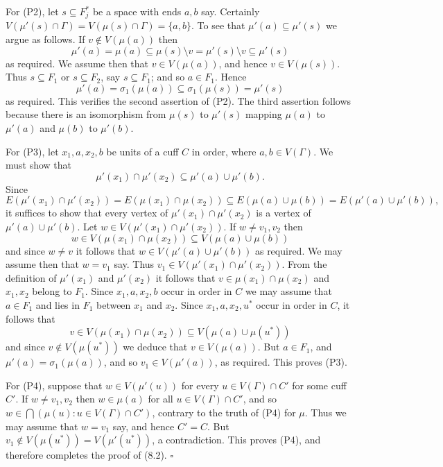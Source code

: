 For (P2), let $s \subseteq F_j^*$ be a space with ends $a, b$ say. Certainly $V(\mu'(s) \cap \Gamma) = V(\mu(s) \cap \Gamma) = \{a, b\}$. To see that $\mu'(a) \subseteq \mu'(s)$ we argue as follows. If $v \notin V(\mu(a))$ then
\begin{equation*}
\mu'(a) = \mu(a) \subseteq \mu(s) \setminus v = \mu'(s) \setminus v \subseteq \mu'(s)
\end{equation*}
as required. We assume then that $v \in V(\mu(a))$, and hence $v \in V(\mu(s))$. Thus $s \subseteq F_1$ or $s \subseteq F_2$, say $s \subseteq F_1$; and so $a \in F_1$. Hence
\begin{equation*}
\mu'(a) = \sigma_1(\mu(a)) \subseteq \sigma_1(\mu(s)) = \mu'(s)
\end{equation*}
as required. This verifies the second assertion of (P2). The third assertion follows because there is an isomorphism from $\mu(s)$ to $\mu'(s)$ mapping $\mu(a)$ to $\mu'(a)$ and $\mu(b)$ to $\mu'(b)$.

For (P3), let $x_1, a, x_2, b$ be units of a cuff $C$ in order, where $a, b \in V(\Gamma)$. We must show that
\begin{equation*}
\mu'(x_1) \cap \mu'(x_2) \subseteq \mu'(a) \cup \mu'(b).
\end{equation*}
Since
\begin{equation*}
E(\mu'(x_1) \cap \mu'(x_2)) = E(\mu(x_1) \cap \mu(x_2)) \subseteq E(\mu(a) \cup \mu(b)) = E(\mu'(a) \cup \mu'(b)),
\end{equation*}
it suffices to show that every vertex of $\mu'(x_1) \cap \mu'(x_2)$ is a vertex of $\mu'(a) \cup \mu'(b)$. Let $w \in V(\mu'(x_1) \cap \mu'(x_2))$. If $w \ne v_1, v_2$ then
\begin{equation*}
w \in V(\mu(x_1) \cap \mu(x_2)) \subseteq V(\mu(a) \cup \mu(b))
\end{equation*}
and since $w \ne v$ it follows that $w \in V(\mu'(a) \cup \mu'(b))$ as required. We may assume then that $w = v_1$ say. Thus $v_1 \in V(\mu'(x_1) \cap \mu'(x_2))$. From the definition of $\mu'(x_1)$ and $\mu'(x_2)$ it follows that $v \in \mu(x_1) \cap \mu(x_2)$ and $x_1, x_2$ belong to $F_1$. Since $x_1, a, x_2, b$ occur in order in $C$ we may assume that $a \in F_1$ and lies in $F_1$ between $x_1$ and $x_2$. Since $x_1, a, x_2, u^*$ occur in order in $C$, it follows that
\begin{equation*}
v \in V(\mu(x_1) \cap \mu(x_2)) \subseteq V(\mu(a) \cup \mu(u^*))
\end{equation*}
and since $v \notin V(\mu(u^*))$ we deduce that $v \in V(\mu(a))$. But $a \in F_1$, and $\mu'(a) = \sigma_1(\mu(a))$, and so $v_1 \in V(\mu'(a))$, as required. This proves (P3).

For (P4), suppose that $w \in V(\mu'(u))$ for every $u \in V(\Gamma) \cap C'$ for some cuff $C'$. If $w \ne v_1, v_2$ then $w \in \mu(a)$ for all $u \in V(\Gamma) \cap C'$, and so $w \in \bigcap(\mu(u) : u \in V(\Gamma) \cap C')$, contrary to the truth of (P4) for $\mu$. Thus we may assume that $w = v_1$ say, and hence $C' = C$. But $v_1 \notin V(\mu(u^*)) = V(\mu'(u^*))$, a contradiction. This proves (P4), and therefore completes the proof of (8.2). $\square$
